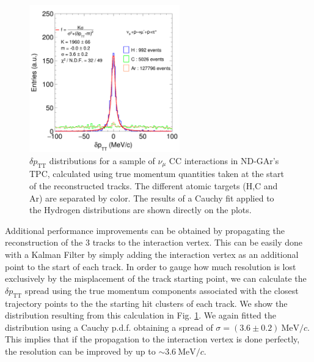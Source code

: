 \begin{figure}[t]
         \centering
         \includegraphics[width=0.58\textwidth]{figures/ch6-TKI/1D/MC_dpTT_numuCC_Fit.png}
        \caption{$\delta p_\text{TT}$ distributions for a sample of $\nu_\mu$ CC interactions in ND-GAr's TPC, calculated using true momentum quantities taken at the start of the reconstructed tracks. The different atomic targets (H,C and Ar) are separated by color. The results of a Cauchy fit applied to the Hydrogen distributions are shown directly on the plots. } \label{fig:dpTTMC_TrackStart}
\end{figure}

Additional performance improvements can be obtained by propagating the reconstruction of the 3 tracks to the interaction vertex. This can be easily done with a Kalman Filter by simply adding the interaction vertex as an additional point to the start of each track. In order to gauge how much resolution is lost exclusively by the misplacement of the track starting point, we can calculate the $\delta p_\text{TT}$ spread using the true momentum components associated with the closest trajectory points to the the starting hit clusters of each track. We show the distribution resulting from this calculation in Fig. \ref{fig:dpTTMC_TrackStart}. We again fitted the distribution using a Cauchy p.d.f. obtaining a spread of $\sigma = (3.6\pm0.2) \ \text{MeV}/c$. This implies that if the propagation to the interaction vertex is done perfectly, the resolution can be improved by up to $\sim 3.6 \ \text{MeV}/c$. 

